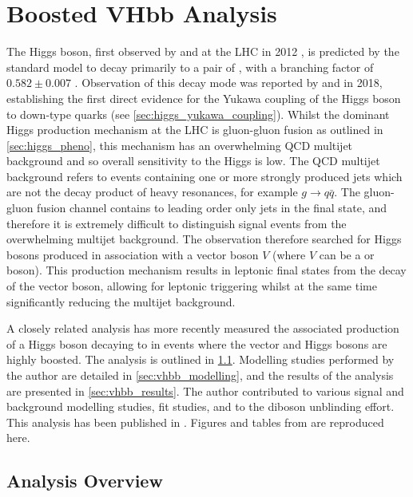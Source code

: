 \chapter{Boosted VHbb Analysis}\label{chap:vhbb_boosted}

The Higgs boson, first observed by \ATLAS and \CMS at the LHC in 2012 \cite{HIGG-2012-27,CMS-HIG-12-028}, is predicted by the standard model to decay primarily to a pair of \bquarks, with a branching factor of $0.582 \pm 0.007$ \cite{deFlorian:2016spz}. 
Observation of this decay mode was reported by \ATLAS \cite{HIGG-2018-04} and \CMS \cite{CMS-HIG-18-016} in 2018, establishing the first direct evidence for the Yukawa coupling of the Higgs boson to down-type quarks (see \cref{sec:higgs_yukawa_coupling}).
Whilst the dominant Higgs production mechanism at the LHC is gluon-gluon fusion as outlined in \cref{sec:higgs_pheno}, this mechanism has an overwhelming QCD multijet background and so overall sensitivity to the Higgs is low.
The QCD multijet background refers to events containing one or more strongly produced jets which are not the decay product of heavy resonances, for example $g \to q\bar{q}$.
The gluon-gluon fusion channel contains to leading order only jets in the final state, and therefore it is extremely difficult to distinguish signal events from the overwhelming multijet background.
The \hbb observation therefore searched for Higgs bosons produced in association with a vector boson $V$ (where $V$ can be a \Wboson or \Zboson boson).
This production mechanism results in leptonic final states from the decay of the vector boson, allowing for leptonic triggering whilst at the same time significantly reducing the multijet background.

A closely related analysis \cite{HIGG-2018-52} has more recently measured the associated production of a Higgs boson decaying to \bquarks in events where the vector and Higgs bosons are highly boosted.
The analysis is outlined in \cref{sec:vhbb_overview}.
Modelling studies performed by the author are detailed in \cref{sec:vhbb_modelling}, and the results of the analysis are presented in \cref{sec:vhbb_results}.
The author contributed to various signal and background modelling studies, fit studies, and to the diboson unblinding effort.
This analysis has been published in .
Figures and tables from  are reproduced here.

\section{Analysis Overview}\label{sec:vhbb_overview}

